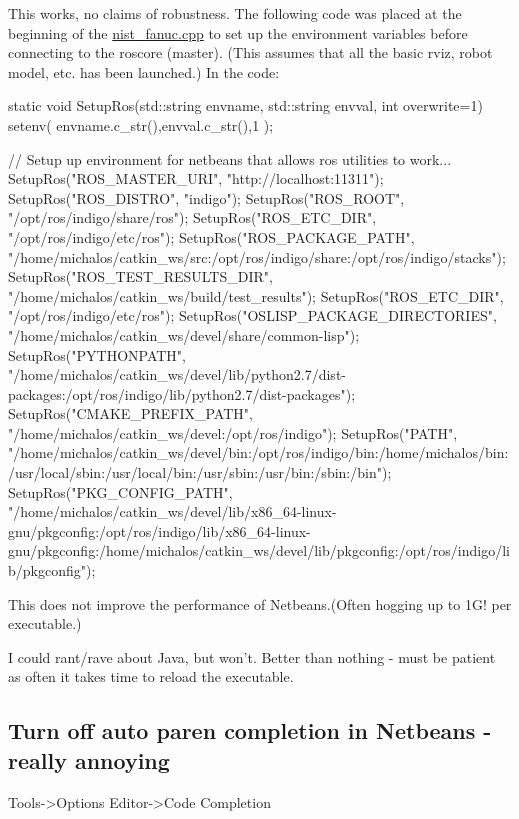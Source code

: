 This works, no claims of robustness. The following code was placed at the beginning of the \hyperlink{nist__fanuc_8cpp}{nist\-\_\-fanuc.\-cpp} to set up the environment variables before connecting to the roscore (master). (This assumes that all the basic rviz, robot model, etc. has been launched.) In the code\-: \begin{DoxyVerb}static void SetupRos(std::string  envname, std::string envval, int overwrite=1)
{
        setenv( envname.c_str(),envval.c_str(),1 );
}

       // Setup up environment for netbeans that allows ros utilities to work...
        SetupRos("ROS_MASTER_URI", "http://localhost:11311");
        SetupRos("ROS_DISTRO", "indigo");
        SetupRos("ROS_ROOT", "/opt/ros/indigo/share/ros");
        SetupRos("ROS_ETC_DIR", "/opt/ros/indigo/etc/ros");
        SetupRos("ROS_PACKAGE_PATH", "/home/michalos/catkin_ws/src:/opt/ros/indigo/share:/opt/ros/indigo/stacks");
        SetupRos("ROS_TEST_RESULTS_DIR", "/home/michalos/catkin_ws/build/test_results");
        SetupRos("ROS_ETC_DIR", "/opt/ros/indigo/etc/ros");
        SetupRos("OSLISP_PACKAGE_DIRECTORIES", "/home/michalos/catkin_ws/devel/share/common-lisp");
        SetupRos("PYTHONPATH", "/home/michalos/catkin_ws/devel/lib/python2.7/dist-packages:/opt/ros/indigo/lib/python2.7/dist-packages");
        SetupRos("CMAKE_PREFIX_PATH", "/home/michalos/catkin_ws/devel:/opt/ros/indigo");
        SetupRos("PATH", "/home/michalos/catkin_ws/devel/bin:/opt/ros/indigo/bin:/home/michalos/bin:/usr/local/sbin:/usr/local/bin:/usr/sbin:/usr/bin:/sbin:/bin");
        SetupRos("PKG_CONFIG_PATH", "/home/michalos/catkin_ws/devel/lib/x86_64-linux-gnu/pkgconfig:/opt/ros/indigo/lib/x86_64-linux-gnu/pkgconfig:/home/michalos/catkin_ws/devel/lib/pkgconfig:/opt/ros/indigo/lib/pkgconfig");
\end{DoxyVerb}


This does not improve the performance of Netbeans.(Often hogging up to 1\-G! per executable.)

I could rant/rave about Java, but won't. Better than nothing -\/ must be patient as often it takes time to reload the executable.

\subsection*{Turn off auto paren completion in Netbeans -\/ really annoying }

\begin{DoxyVerb}Tools->Options
Editor->Code Completion
\end{DoxyVerb}



